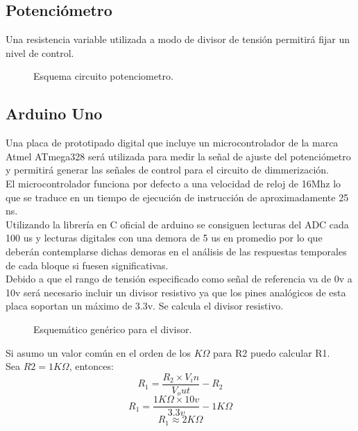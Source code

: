 \documentclass[a4paper,11pt]{article}
\begin{document}
\subsection{Potenciómetro}
Una resistencia variable utilizada a modo de divisor de tensión permitirá fijar un nivel de control.
\begin{figure}[H] %
	\caption{Esquema circuito potenciometro.}
	\label{fig:potenciometro}
\end{figure} 

\subsection{Arduino Uno}
Una placa de prototipado digital que incluye un microcontrolador de la marca Atmel ATmega328 será utilizada para medir la señal de ajuste del potenciómetro y permitirá generar las señales de control para el circuito de dimmerización.\\
El microcontrolador funciona por defecto a una velocidad de reloj de 16Mhz lo que se traduce en un tiempo de ejecución de instrucción de aproximadamente 25 ns.\\
Utilizando la librería en C oficial de arduino se consiguen lecturas del ADC cada 100 us y lecturas digitales con una demora de 5 us en promedio por lo que deberán contemplarse dichas demoras en el análisis de las respuestas temporales de cada bloque si fuesen significativas.\\
Debido a que el rango de tensión especificado como señal de referencia va de 0v a 10v será necesario incluir un divisor resistivo ya que los pines analógicos de esta placa soportan un máximo de 3.3v.
Se calcula el divisor resistivo.

\begin{figure}[H] %
	\caption{Esquemático genérico para el divisor.}
	\label{fig:divisor_general}
\end{figure} 

Si asumo un valor común en el orden de los $K\Omega$ para R2 puedo calcular R1.\\
Sea $R2=1K\Omega$, entonces:\\
$$R_1 = \frac{R_2\times V_in}{V_out} - R_2$$
$$R_1 = \frac{1K\Omega\times 10v}{3.3v} - 1K\Omega$$
$$R_1 \approx 2K\Omega$$
\end{document}

